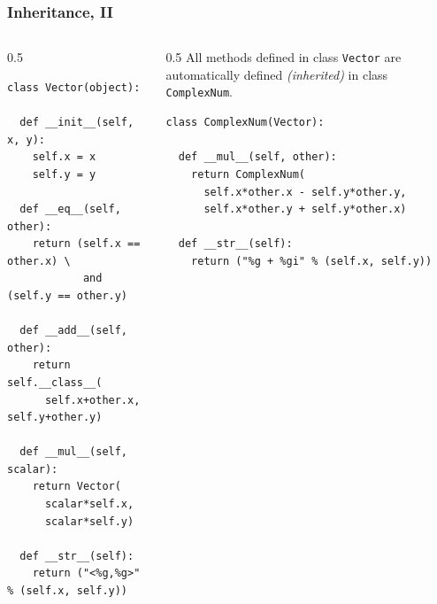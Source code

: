 \begin{frame}[fragile]\frametitle{Inheritance, II}

  \begin{columns}[t]
    \begin{column}{0.5\linewidth}
\begin{lstlisting}[basicstyle=\tiny\ttfamily,showstringspaces=false]
class Vector(object):

  def __init__(self, x, y):
    self.x = x
    self.y = y

  def __eq__(self, other):
    return (self.x == other.x) \
            and (self.y == other.y)

  def __add__(self, other):
    return self.__class__(
      self.x+other.x, self.y+other.y)

  def __mul__(self, scalar):
    return Vector(
      scalar*self.x,
      scalar*self.y)

  def __str__(self):
    return ("<%g,%g>" % (self.x, self.y))
\end{lstlisting}
    \end{column}
    \begin{column}{0.5\linewidth}
  All methods defined in class \texttt{Vector} are automatically
  defined \emph{(inherited)} in class \texttt{ComplexNum}.
\begin{lstlisting}[basicstyle=\tiny\ttfamily,showstringspaces=false]
class ComplexNum(Vector):

  def __mul__(self, other):
    return ComplexNum(
      self.x*other.x - self.y*other.y,
      self.x*other.y + self.y*other.x)

  def __str__(self):
    return ("%g + %gi" % (self.x, self.y))
\end{lstlisting}
    \end{column}
  \end{columns}
\end{frame}

